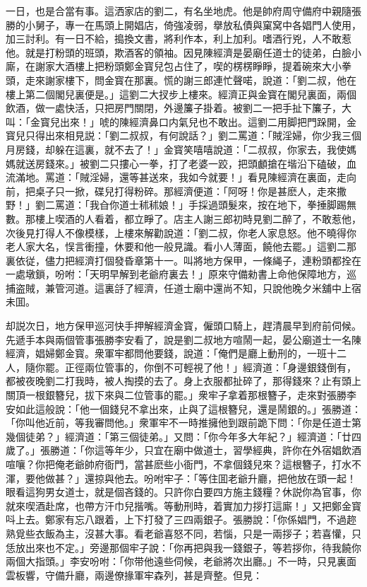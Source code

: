 一日，也是合當有事。這洒家店的劉二，有名坐地虎。他是帥府周守備府中親隨張勝的小舅子，專一在馬頭上開娼店，倚強凌弱，擧放私債與窠窝中各娼門人使用，加三討利。有一日不給，搗換文書，將利作本，利上加利。嗜酒行兇，人不敢惹他。就是打粉頭的班頭，欺酒客的領袖。因見陳經濟是晏廟任道士的徒弟，白臉小廝，在謝家大酒樓上把粉頭鄭金寳兒包占住了，喫的楞楞睜睜，提着碗來大小拳頭，走來謝家樓下，問金寳在那裏。慌的謝三郎連忙聲喏，說道：「劉二叔，他在樓上第二個閣兒裏便是。」這劉二大扠步上樓來。經濟正與金寳在閣兒裏面，兩個飲酒，做一處快活，只把房門關閉，外邊簾子掛着。被劉二一把手扯下簾子，大叫：「金寳兒出來！」唬的陳經濟鼻口内氣兒也不敢出。這劉二用脚把門跺開，金寳兒只得出來相見説：「劉二叔叔，有何說話？」劉二罵道：「賊淫婦，你少我三個月房錢，却躲在這裏，就不去了！」金寳笑嘻嘻說道：「二叔叔，你家去，我使媽媽就送房錢來。」被劉二只摟心一拳，打了老婆一跤，把頭顱搶在堦沿下磕破，血流滿地。罵道：「賊淫婦，還等甚送來，我如今就要！」看見陳經濟在裏面，走向前，把桌子只一掀，碟兒打得粉碎。那經濟便道：「阿呀！你是甚麽人，走來撒野！」劉二罵道：「我㒲你道士秫秫娘！」手採過頭髮來，按在地下，拳捶脚踢無數。那樓上喫酒的人看着，都立睜了。店主人謝三郎初時見劉二醉了，不敢惹他，次後見打得人不像模樣，上樓來解勸說道：「劉二叔，你老人家息怒。他不曉得你老人家大名，悮言衝撞，休要和他一般見識。看小人薄面，饒他去罷。」這劉二那裏依従，儘力把經濟打個發昏章第十一。叫將地方保甲，一條䋲子，連粉頭都拴在一處墩鎖，吩咐：「天明早解到老爺府裏去！」原來守備勑書上命他保障地方，巡捕盗賊，兼管河道。這裏㧱了經濟，任道士廟中還尚不知，只說他晚夕米舖中上宿未囬。

却説次日，地方保甲巡河快手押解經濟金寳，僱頭口騎上，趕清晨早到府前伺候。先遞手本與兩個管事張勝李安看了，說是劉二叔地方喧鬧一起，晏公廟道士一名陳經濟，娼婦鄭金寳。衆軍牢都問他要錢，說道：「俺們是廳上動刑的，一班十二人，隨你罷。正徑兩位管事的，你倒不可輕視了他！」經濟道：「身邊銀錢倒有，都被夜晚劉二打我時，被人掏摸的去了。身上衣服都扯碎了，那得錢來？止有頭上關頂一根銀簪兒，拔下來與二位管事的罷。」衆牢子拿着那根簪子，走來對張勝李安如此這般說：「他一個錢兒不拿出來，止與了這根簪兒，還是鬧銀的。」張勝道：「你叫他近前，等我審問他。」衆軍牢不一時推擁他到跟前跪下問：「你是任道士第幾個徒弟？」經濟道：「第三個徒弟。」又問：「你今年多大年紀？」經濟道：「廿四歲了。」張勝道：「你這等年少，只宜在廟中做道士，習學經典，許你在外宿娼飲酒喧嚷？你把俺老爺帥府衙門，當甚麽些小衙門，不拿個錢兒來？這根簪子，打水不渾，要他做甚？」還掠與他去。吩咐牢子：「等住囬老爺升廳，把他放在頭一起！眼看這狗男女道士，就是個吝錢的。只許你白要四方施主錢糧？休説你為官事，你就來喫酒赴席，也帶方汗巾兒揩嘴。等動刑時，着實加力拶打這廝！」又把鄭金寳呌上去。鄭家有忘八跟着，上下打發了三四兩銀子。張勝說：「你係娼門，不過趂熟覓些衣飯為主，沒甚大事。看老爺喜怒不同，若惱，只是一兩拶子；若喜懽，只恁放出來也不定。」旁邊那個牢子說：「你再把與我一錢銀子，等若拶你，待我饒你兩個大指頭。」李安吩咐：「你带他遠些伺候，老爺將次出廳。」不一時，只見裏面雲板響，守備升廳，兩邊僚掾軍牢森列，甚是齊整。但見：


